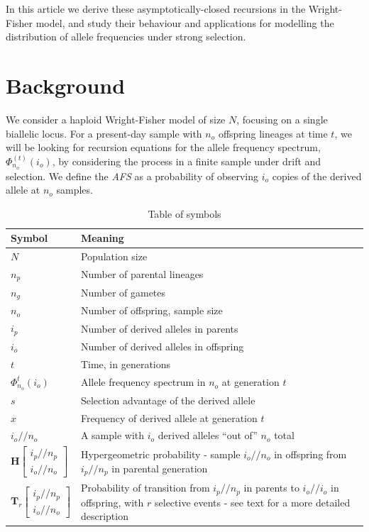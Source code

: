 \documentclass[review]{elsarticle}
\newcommand{\afs}[2]{\Phi_{#1}^{(#2)}}
\newcommand{\dslash}{/\!\!/}
\newcommand{\Coalc}[4]{\begin{bmatrix}#1\dslash #2 \\ #3\dslash #4 \end{bmatrix}}
\begin{document}
In this article we derive these asymptotically-closed recursions in the Wright-Fisher model, and
study their behaviour and applications for modelling the distribution of allele frequencies under
strong selection.

\section{Background}
\label{sec:background}

We consider a haploid Wright-Fisher model of size $N$, focusing on a single biallelic locus. For a
present-day sample with $n_o$ offspring lineages at time $t$, we will be looking for recursion
equations for the allele frequency spectrum, $\afs{n_o}{t}(i_o)$, by considering the process in a
finite sample under drift and selection. We define the \textit{AFS} as a probability of observing
$i_o$ copies of the derived allele at $n_o$ samples.

\begin{table}
  \centering
  \begin{tabular}{l|p{100mm}}
    Symbol & Meaning\\
    \hline
    $N$ & Population size\\
    $n_p$ & Number of parental lineages\\
    $n_g$ & Number of gametes\\
    $n_o$ & Number of offspring, sample size\\
    $i_p$ & Number of derived alleles in parents\\
    $i_o$ & Number of derived alleles in offspring\\
    $t$ & Time, in generations\\
    $\Phi_{n_o}^{t}(i_o)$ & Allele frequency spectrum in $n_o$ at generation $t$\\
    $s$ & Selection advantage of the derived allele\\
    $x$ & Frequency of derived allele at generation $t$\\
    $i_o \dslash n_o$ & A sample with $i_o$ derived alleles ``out of'' $n_o$ total\\
    $\mathbf{H}\Coalc{i_p}{n_p}{i_o}{n_o}$ & Hypergeometric probability -
                                             sample $i_o \dslash n_o$ in offspring from $i_p \dslash n_p$ in parental generation\\
    $\mathbf{T}_{r}\Coalc{i_p}{n_p}{i_o}{n_o}$ & Probability of transition from $i_p \dslash n_p$ in parents
                                                 to $i_o \dslash i_o$ in offspring, with $r$ selective events -
                                                 see text for a more detailed description\\
  \end{tabular}
  \caption{\label{tab:symbols} Table of symbols}
\end{table}
\end{document}
